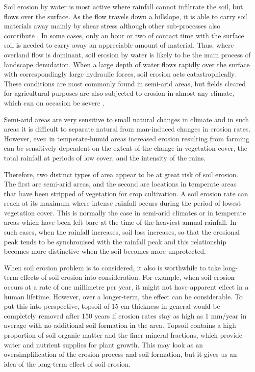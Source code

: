 Soil erosion by water is most active where rainfall cannot infiltrate the soil,
but flows over the surface. As the flow travels down a hillslope, it is able to
carry soil materials away mainly by shear stress although other sub-processes
also contribute \citep{kinnell2000-discourse,kinnell2005-2815}. In some
cases, only an hour or two of contact time with the surface soil is needed to
carry away an appreciable amount of material. Thus, where overland flow is
dominant, soil erosion by water is likely to be the main process of landscape
denudation. When a large depth of water flows rapidly over the surface with
correspondingly large hydraulic forces, soil erosion acts catastrophically.
These conditions are most commonly found in semi-arid areas, but fields cleared
for agricultural purposes are also subjected to erosion in almost any climate,
which can on occasion be severe \citep{boardman2001-346,boardman2003-176}.

Semi-arid areas are very sensitive to small natural changes in climate and in
such areas it is difficult to separate natural from man-induced changes in
erosion rates. However, even in temperate-humid areas increased erosion
resulting from farming can be sensitively dependent on the extent of the change
in vegetation cover, the total rainfall at periods of low cover, and the
intensity of the rains.

Therefore, two distinct types of area appear to be at great risk of soil
erosion. The first are semi-arid areas, and the second are locations in
temperate areas that have been stripped of vegetation for crop cultivation. A
soil erosion rate can reach at its maximum where intense rainfall occurs during
the period of lowest vegetation cover. This is normally the case in semi-arid
climates or in temperate areas which have been left bare at the time of the
heaviest annual rainfall. In such cases, when the rainfall increases, soil loss
increases, so that the erosional peak tends to be synchronised with the rainfall
peak and this relationship becomes more distinctive when the soil becomes more
unprotected.

When soil erosion problem is to considered, it also is worthwhile to take
long-term effects of soil erosion into consideration. For example, when soil
erosion occurs at a rate of one millimetre per year, it might not have apparent
effect in a human lifetime. However, over a longer-term, the effect can be
considerable. To put this into perspective, topsoil of 15 cm thickness in
general would be completely removed after 150 years if erosion rates stay as
high as 1 mm/year in average with no additional soil formation in the area.
Topsoil contains a high proportion of soil organic matter and the finer mineral
fractions, which provide water and nutrient supplies for plant growth. This may
look as an oversimplification of the erosion process and soil formation, but it
gives us an idea of the long-term effect of soil erosion.


